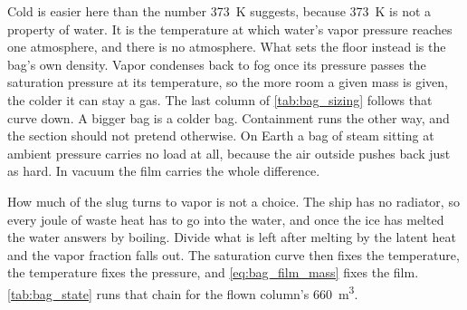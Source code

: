 \documentclass{article}
\begin{document}
Cold is easier here than the number \SI{373}{\kelvin} suggests, because \SI{373}{\kelvin} is not a property of water. It is the temperature at which water's vapor pressure reaches one atmosphere, and there is no atmosphere. What sets the floor instead is the bag's own density. Vapor condenses back to fog once its pressure passes the saturation pressure at its temperature, so the more room a given mass is given, the colder it can stay a gas. The last column of \autoref{tab:bag_sizing} follows that curve down. A bigger bag is a colder bag. Containment runs the other way, and the section should not pretend otherwise. On Earth a bag of steam sitting at ambient pressure carries no load at all, because the air outside pushes back just as hard. In vacuum the film carries the whole difference.

How much of the slug turns to vapor is not a choice. The ship has no radiator, so every joule of waste heat has to go into the water, and once the ice has melted the water answers by boiling. Divide what is left after melting by the latent heat and the vapor fraction falls out. The saturation curve then fixes the temperature, the temperature fixes the pressure, and \autoref{eq:bag_film_mass} fixes the film. \autoref{tab:bag_state} runs that chain for the flown column's \SI{660}{\cubic\meter}.
\end{document}
